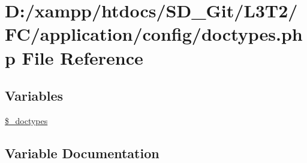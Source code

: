 \hypertarget{application_2config_2doctypes_8php}{}\section{D\+:/xampp/htdocs/\+S\+D\+\_\+\+Git/\+L3\+T2/\+F\+C/application/config/doctypes.php File Reference}
\label{application_2config_2doctypes_8php}
\subsection*{Variables}
\begin{DoxyCompactItemize}
\item 
\hyperlink{application_2config_2doctypes_8php_aae4e5521057605d22a78c29c7d4ad7de}{\$\+\_\+doctypes}
\end{DoxyCompactItemize}


\subsection{Variable Documentation}
\hypertarget{application_2config_2doctypes_8php_aae4e5521057605d22a78c29c7d4ad7de}{}
